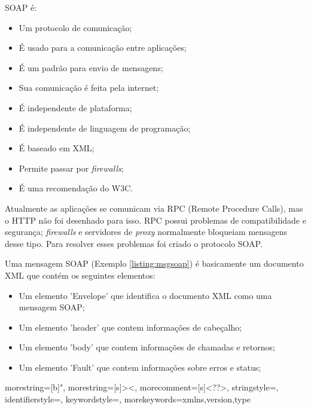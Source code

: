 SOAP é:

\begin{itemize}
	\item Um protocolo de comunicação;
	\item É usado para a comunicação entre aplicações;
	\item É um padrão para envio de mensagens;
	\item Sua comunicação é feita pela internet;
	\item É independente de plataforma;
	\item É independente de linguagem de programação;
	\item É baseado em XML;
	\item Permite passar por \textit{firewalls};
	\item É uma recomendação do W3C.
\end{itemize}

Atualmente as aplicações se comunicam via RPC (Remote Procedure Calls), mas o HTTP não foi desenhado para isso. RPC possui problemas de compatibilidade e segurança; \textit{firewalls} e servidores de \textit{proxy} normalmente bloqueiam mensagens desse tipo. Para resolver esses problemas foi criado o protocolo SOAP.

Uma mensagem SOAP (Exemplo \ref{listing:msgsoap}) é basicamente um documento XML que contém os seguintes elementos:

\begin{itemize}
	\item Um elemento 'Envelope' que identifica o documento XML como uma mensagem SOAP;
	\item Um elemento 'header' que contem informações de cabeçalho;
	\item Um elemento 'body' que contem informações de chamadas e retornos;
	\item Um elemento 'Fault' que contem informações sobre erros e status;
\end{itemize}




{
  morestring=[b]",
  morestring=[s]{>}{<},
  morecomment=[s]{<?}{?>},
  stringstyle=\color{black},
  identifierstyle=\color{darkblue},
  keywordstyle=\color{cyan},
  morekeywords={xmlns,version,type}%
}



